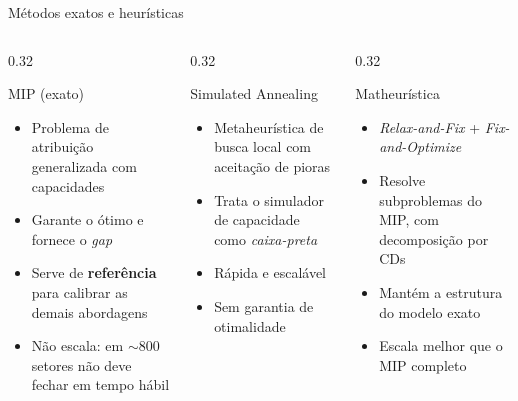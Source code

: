 \documentclass[aspectratio=169,11pt]{beamer}
\begin{document}
\begin{frame}{Métodos exatos e heurísticas}
  \small
  \begin{columns}[T]
    \begin{column}{0.32\textwidth}
      \begin{block}{MIP (exato)}
        \begin{itemize}
          \item Problema de atribuição generalizada com capacidades \cite{oncan_survey_2007}
          \item Garante o ótimo e fornece o \textit{gap}
          \item Serve de \textbf{referência} para calibrar as demais abordagens
          \item Não escala: em $\sim$800 setores não deve fechar em tempo hábil
        \end{itemize}
      \end{block}
    \end{column}

    \begin{column}{0.32\textwidth}
      \begin{block}{Simulated Annealing}
        \begin{itemize}
          \item Metaheurística de busca local com aceitação de pioras \cite{kirkpatrick1983optimization}
          \item Trata o simulador de capacidade como \textit{caixa-preta}
          \item Rápida e escalável
          \item Sem garantia de otimalidade
        \end{itemize}
      \end{block}
    \end{column}

    \begin{column}{0.32\textwidth}
      \begin{block}{Matheurística}
        \begin{itemize}
          \item \textit{Relax-and-Fix} + \textit{Fix-and-Optimize} \cite{carvalho2022hybrid}
          \item Resolve subproblemas do MIP, com decomposição por CDs
          \item Mantém a estrutura do modelo exato
          \item Escala melhor que o MIP completo
        \end{itemize}
      \end{block}
    \end{column}
  \end{columns}


\end{frame}
\end{document}
